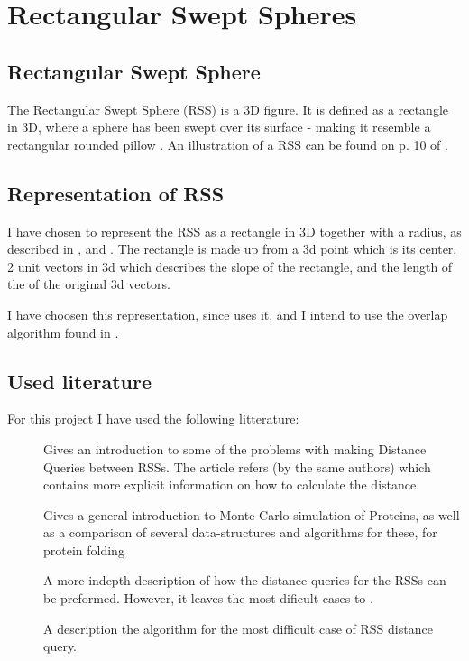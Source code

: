 
\section{Rectangular Swept Spheres}
\label{rss}

\subsection{Rectangular Swept Sphere}
The Rectangular Swept Sphere (RSS) is a 3D figure. It is defined as a rectangle in 3D, where a sphere has been swept over its surface - making it resemble a rectangular rounded pillow . An illustration of a RSS can be found on p. 10 of \cite{Larsen99fastproximity}. 

\subsection{Representation of RSS}
I have chosen to represent the RSS as a rectangle in 3D together with a radius, as described in \cite{larsen00fast}, \cite{Larsen99fastproximity} and \cite{237244}. The rectangle is made up from a 3d point which is its center, 2 unit vectors in 3d which describes the slope  of the rectangle, and the length of the of the original 3d vectors.

I have choosen this representation, since \cite{327244} uses it, and I intend to use the overlap algorithm found in \cite{237244}.


\subsection{Used literature}
For this project I have used the following litterature:
\begin{description}
\item[\cite{larsen00fast}] Gives an introduction to some of the problems with making Distance Queries between RSSs. The article refers \cite{Larsen99fastproximity} (by the same authors) which contains more explicit information on how to calculate the distance. 
\item[\cite{Lotan03algorithmand}] Gives a general introduction to Monte Carlo simulation of Proteins, as well as a comparison of several data-structures and algorithms for these, for protein folding 
\item[\cite{Larsen99fastproximity}] A more indepth description of how the distance queries for the RSSs can be preformed. However, it leaves the most dificult cases to \cite{237244}.
\item[\cite{237244}] A description the algorithm for the most difficult case of RSS distance query.
\end{description}
